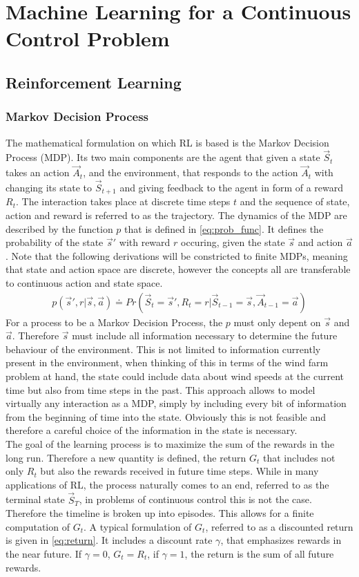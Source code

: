 \section{Machine Learning for a Continuous Control Problem}
\subsection{Reinforcement Learning}
\subsubsection{Markov Decision Process}
The mathematical formulation on which RL is based is the Markov Decision Process (MDP). Its two main components are the agent that given a state $\vec{S}_t$ takes an action $\vec{A}_t$, and the environment, that responds to the action $\vec{A}_t$ with changing its state to $\vec{S}_{t+1}$ and giving feedback to the agent in form of a reward $R_t$. The interaction takes place at discrete time steps $t$ and the sequence of state, action and reward is referred to as the trajectory. The dynamics of the MDP are described by the function $p$ that is defined in \eqref{eq:prob_func}. It defines the probability of the state $\vec{s}'$ with reward $r$ occuring, given the state $\vec{s}$ and action $\vec{a}$. Note that the following derivations will be constricted to finite MDPs, meaning that state and action space are discrete, however the concepts all are transferable to continuous action and state space.
\begin{align}
	p(\vec{s}',r \vert \vec{s},\vec{a}) \doteq Pr(\vec{S}_t=\vec{s}', R_t=r \vert \vec{S}_{t-1} = \vec{s}, \vec{A}_{t-1} = \vec{a}) \label{eq:prob_func}
\end{align}
For a process to be a Markov Decision Process, the $p$ must only depent on $\vec{s}$ and $\vec{a}$. Therefore $\vec{s}$ must include all information necessary to determine the future behaviour of the environment. This is not limited to information currently present in the environment, when thinking of this in terms of the wind farm problem at hand, the state could include data about wind speeds at the current time but also from time steps in the past. This approach allows to model virtually any interaction as a MDP, simply by including every bit of information from the beginning of time into the state. Obviously this is not feasible and therefore a careful choice of the information in the state is necessary. \\
The goal of the learning process is to maximize the sum of the rewards in the long run. Therefore a new quantity is defined, the return $G_t$ that includes not only $R_t$ but also the rewards received in future time steps. While in many applications of RL, the process naturally comes to an end, referred to as the terminal state $\vec{S}_T$, in problems of continuous control this is not the case. Therefore the timeline is broken up into episodes. This allows for a finite computation of $G_t$. A typical formulation of $G_t$, referred to as a discounted return is given in \eqref{eq:return}. It includes a discount rate $\gamma$, that emphasizes rewards in the near future. If $\gamma = 0$, $G_t = R_t$, if $\gamma = 1$, the return is the sum of all future rewards. \cite[p. 47- 57]{sutton_reinforcement_2018}
